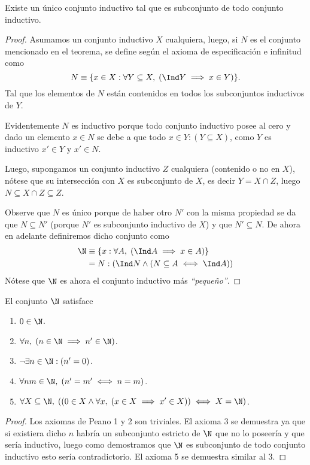 \documentclass[11pt,oneside,a4paper]{book}
\begin{document}
\begin{thm}
Existe un único conjunto inductivo tal que es subconjunto de todo conjunto inductivo.
\end{thm}
\begin{proof}
Asumamos un conjunto inductivo $X$ cualquiera, luego, si $N$ es el conjunto mencionado en el teorema, se define según el axioma de especificación e infinitud como
$$N\equiv\{x\in X:\forall Y\subseteq X,\;(\Ind Y\implies x\in Y)\}.$$
Tal que los elementos de $N$ están contenidos en todos los subconjuntos inductivos de $Y$.

Evidentemente $N$ es inductivo porque todo conjunto inductivo posee al cero y dado un elemento $x\in N$ se debe a que todo $x\in Y:(Y\subseteq X)$, como $Y$ es inductivo $x'\in Y$ y $x'\in N$.

Luego, supongamos un conjunto inductivo $Z$ cualquiera (contenido o no en $X$), nótese que su intersección con $X$ es subconjunto de $X$, es decir $Y=X\cap Z$, luego $N\subseteq X\cap Z\subseteq Z$.

Observe que $N$ es único porque de haber otro $N'$ con la misma propiedad se da que $N\subseteq N'$ (porque $N'$ es subconjunto inductivo de $X$) y que $N'\subseteq N$. De ahora en adelante definiremos dicho conjunto como
$$
\begin{aligned}
\N&\equiv\{x:\forall A,\;(\Ind A\implies x\in A)\}\\
&=N:(\Ind N\wedge(N\subseteq A\iff\Ind A))
\end{aligned}
$$
Nótese que $\N$ es ahora el conjunto inductivo más \textit{``pequeño''}.
\end{proof}

\begin{thm}
El conjunto $\N$ satisface
\begin{enumerate}
\item $0\in\N$.
\item $\forall n,\;(n\in\N\implies n'\in\N)$.
\item $\neg\exists n\in\N:(n'=0)$.
\item $\forall nm\in\N,\;(n'=m'\iff n=m)$.
\item $\forall X\subseteq\N,\;((0\in X\wedge\forall x,\;(x\in X\implies x'\in X))\iff X=\N)$.
\end{enumerate}
\end{thm}
\begin{proof}
Los axiomas de Peano 1 y 2 son triviales. El axioma 3 se demuestra ya que si existiera dicho $n$ habría un subconjunto estricto de $\N$ que no lo poseería y que sería inductivo, luego como demostramos que $\N$ es subconjunto de todo conjunto inductivo esto sería contradictorio. El axioma 5 se demuestra similar al 3.
\end{proof}
\end{document}
